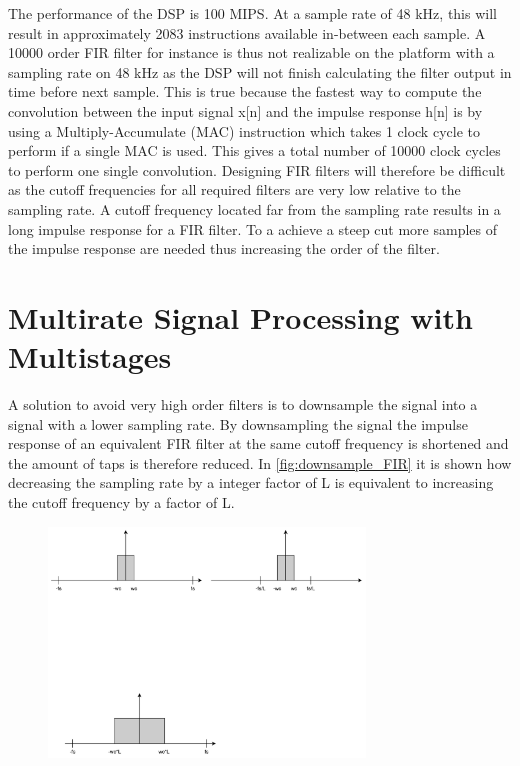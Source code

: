 The performance of the DSP is 100 MIPS. At a sample rate of 48 kHz, this will result in approximately 2083 instructions available in-between each sample. A 10000 order FIR filter for instance is thus not realizable on the platform with a sampling rate on 48 kHz as the DSP will not finish calculating the filter output in time before next sample. This is true because the fastest way to compute the convolution between the input signal x[n] and the impulse response h[n] is by using a Multiply-Accumulate (MAC) instruction which takes 1 clock cycle to perform if a single MAC is used. This gives a total number of 10000 clock cycles to perform one single convolution. Designing FIR filters will therefore be difficult as the cutoff frequencies for all required filters are very low relative to the sampling rate. A cutoff frequency located far from the sampling rate results in a long impulse response for a FIR filter. To a achieve a steep cut more samples of the impulse response are needed thus increasing the order of the filter. 

\section{Multirate Signal Processing with Multistages}
A solution to avoid very high order filters is to downsample the signal into a signal with a lower sampling rate. By downsampling the signal the impulse response of an equivalent FIR filter at the same cutoff frequency is shortened and the amount of taps is therefore reduced. In \autoref{fig:downsample_FIR} it is shown how decreasing the sampling rate by a integer factor of L is equivalent to increasing the cutoff frequency by a factor of L.


\begin{figure}[H]
\centering
\includegraphics[width=0.75\textwidth]{figures/downsample_FIR.pdf}
\caption{}
\label{fig:downsample_FIR}
\end{figure}

